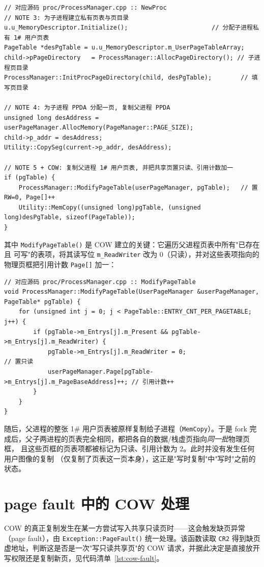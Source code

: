 \begin{lstlisting}[caption={fork (NewProc) 的 COW 建立},label={lst:newproc}]
// 对应源码 proc/ProcessManager.cpp :: NewProc
// NOTE 3: 为子进程建立私有页表与页目录
u.u_MemoryDescriptor.Initialize();                       // 分配子进程私有 1# 用户页表
PageTable *desPgTable = u.u_MemoryDescriptor.m_UserPageTableArray;
child->pPageDirectory   = ProcessManager::AllocPageDirectory(); // 子进程页目录
ProcessManager::InitProcPageDirectory(child, desPgTable);        // 填写页目录

// NOTE 4: 为子进程 PPDA 分配一页, 复制父进程 PPDA
unsigned long desAddress = userPageManager.AllocMemory(PageManager::PAGE_SIZE);
child->p_addr = desAddress;
Utility::CopySeg(current->p_addr, desAddress);

// NOTE 5 + COW: 复制父进程 1# 用户页表, 并把共享页置只读、引用计数加一
if (pgTable) {
    ProcessManager::ModifyPageTable(userPageManager, pgTable);   // 置 RW=0, Page[]++
    Utility::MemCopy((unsigned long)pgTable, (unsigned long)desPgTable, sizeof(PageTable));
}
\end{lstlisting}

其中 \texttt{ModifyPageTable()} 是 COW 建立的关键：它遍历父进程页表中所有"已存在且
可写"的表项，将其读写位 \texttt{m\_ReadWriter} 改为 0（只读），并对这些表项指向的
物理页框把引用计数 \texttt{Page[]} 加一：

\begin{lstlisting}[caption={ModifyPageTable: 共享页置只读并增加引用计数},label={lst:modify-pt}]
// 对应源码 proc/ProcessManager.cpp :: ModifyPageTable
void ProcessManager::ModifyPageTable(UserPageManager &userPageManager, PageTable* pgTable) {
    for (unsigned int j = 0; j < PageTable::ENTRY_CNT_PER_PAGETABLE; j++) {
        if (pgTable->m_Entrys[j].m_Present && pgTable->m_Entrys[j].m_ReadWriter) {
            pgTable->m_Entrys[j].m_ReadWriter = 0;                       // 置只读
            userPageManager.Page[pgTable->m_Entrys[j].m_PageBaseAddress]++; // 引用计数++
        }
    }
}
\end{lstlisting}

随后，父进程的整张 1\# 用户页表被原样复制给子进程（\texttt{MemCopy}）。于是 fork
完成后，父子两进程的页表完全相同，都把各自的数据/栈虚页指向\emph{同一批}物理页框，
且这些页框的页表项都被标记为只读、引用计数为 2。此时并没有发生任何用户图像的复制
（仅复制了页表这一页本身），这正是"写时复制"中"写时"之前的状态。

\section{page fault 中的 COW 处理}
COW 的真正复制发生在某一方尝试写入共享只读页时——这会触发缺页异常
（page fault），由 \texttt{Exception::PageFault()} 统一处理。该函数读取 \texttt{CR2}
得到缺页虚地址，判断这是否是一次"写只读共享页"的 COW 请求，并据此决定是直接放开
写权限还是复制新页，见代码清单~\ref{lst:cow-fault}。

